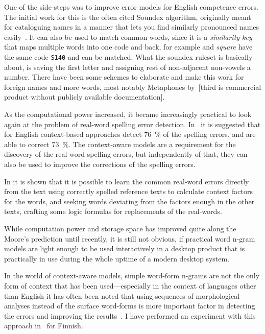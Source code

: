 \documentclass[officiallayout,draft]{unihelcompling}
\newcommand\misspelt{\bgroup\markoverwith
{\textcolor{red}{\lower3.5pt\hbox{\sixly \char58}}}\ULon}
\begin{document}
One of the side-steps was to improve error models for English competence
errors. The initial work for this is the often cited Soundex algorithm,
originally meant for cataloguing names in a manner that lets you find similarly
pronounced names easily~\citep{russell1918soundex}. It can also be used to
match common words, since it is a \emph{similarity key} that maps multiple
words into one code and back, for example \misspelt{squer} and \emph{square}
have the same code \texttt{S140} and can be matched. What the soundex ruleset
is basically about, is saving the first letter and assigning rest of
non-adjacent non-vowels a number. There have been some schemes to elaborate and
make this work for foreign names and more words, most notably Metaphones 
by~\citet{philips1990hanging,philips2000double}[third is commercial product
without publicly available documentation].

As the computational power increased, it became increasingly practical to look
again at the problem of real-word spelling error detection.
In~\citet{mays1991context} it is suggested that for English context-based
approaches detect 76~\% of the spelling errors, and are able to correct 73~\%.
The context-aware models are a requirement for the discovery of the real-word
spelling errors, but independently of that, they can also be used to improve
the corrections of the spelling errors. 

In \citet{al2006learning} it is shown that it is possible to learn the common
real-word errors directly from the text using correctly spelled reference texts
to calculate context factors for the words, and seeking words deviating from
the factors enough in the other texts, crafting some logic formulas for
replacements of the real-words.

While computation power and storage space has improved quite along the Moore's
prediction until recently, it is still not obvious, if practical word n-gram
models are light enough to be used interactively in a desktop product that is
practically in use during the whole uptime of a modern desktop system.

In the world of context-aware models, simple word-form n-grams are not the only
form of context that has been used---especially in the context of languages
other than English it has often been noted that using sequences of
morphological analyses instead of the surface word-forms is more important
factor in detecting the errors and improving the results~\citep[for
Spanish]{otero2007contextual}. I have performed an experiment with this
approach in~ for Finnish.
\end{document}
